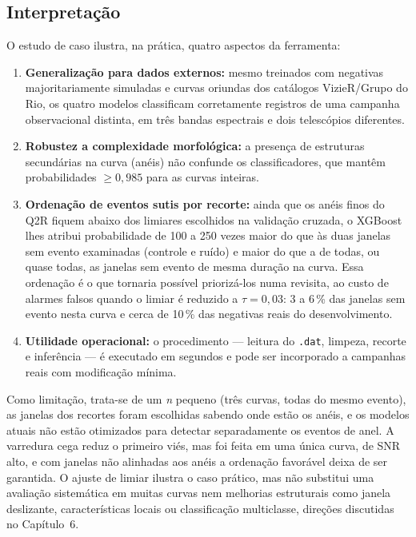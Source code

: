 \subsection{Interpretação}

O estudo de caso ilustra, na prática, quatro aspectos da ferramenta:

\begin{enumerate}
	\item \textbf{Generalização para dados externos:} mesmo treinados com negativas majoritariamente simuladas e curvas oriundas dos catálogos VizieR/Grupo do Rio, os quatro modelos classificam corretamente registros de uma campanha observacional distinta, em três bandas espectrais e dois telescópios diferentes.
	\item \textbf{Robustez a complexidade morfológica:} a presença de estruturas secundárias na curva (anéis) não confunde os classificadores, que mantêm probabilidades $\geq 0{,}985$ para as curvas inteiras.
	\item \textbf{Ordenação de eventos sutis por recorte:} ainda que os anéis finos do Q2R fiquem abaixo dos limiares escolhidos na validação cruzada, o XGBoost lhes atribui probabilidade de 100 a 250 vezes maior do que às duas janelas sem evento examinadas (controle e ruído) e maior do que a de todas, ou quase todas, as janelas sem evento de mesma duração na curva. Essa ordenação é o que tornaria possível priorizá-los numa revisita, ao custo de alarmes falsos quando o limiar é reduzido a $\tau = 0{,}03$: 3 a 6\,\% das janelas sem evento nesta curva e cerca de 10\,\% das negativas reais do desenvolvimento.
	\item \textbf{Utilidade operacional:} o procedimento --- leitura do \texttt{.dat}, limpeza, recorte e inferência --- é executado em segundos e pode ser incorporado a campanhas reais com modificação mínima.
\end{enumerate}

Como limitação, trata-se de um \textit{n} pequeno (três curvas, todas do mesmo evento), as janelas dos recortes foram escolhidas sabendo onde estão os anéis, e os modelos atuais não estão otimizados para detectar separadamente os eventos de anel. A varredura cega reduz o primeiro viés, mas foi feita em uma única curva, de SNR alto, e com janelas não alinhadas aos anéis a ordenação favorável deixa de ser garantida. O ajuste de limiar ilustra o caso prático, mas não substitui uma avaliação sistemática em muitas curvas nem melhorias estruturais como janela deslizante, características locais ou classificação multiclasse, direções discutidas no Capítulo~6.

